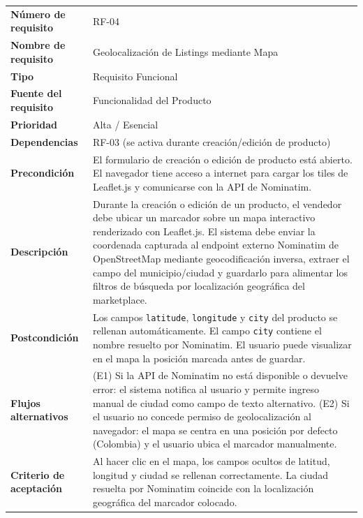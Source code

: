 \documentclass[11pt,a4paper]{report}
\begin{document}
\begin{table}[H]
\centering
\begin{tabularx}{\textwidth}{|l|L|}
\hline
{} \\ \hline
\textbf{Número de requisito} & RF-04 \\ \hline
\textbf{Nombre de requisito} & Geolocalización de Listings mediante Mapa \\ \hline
\textbf{Tipo} & Requisito Funcional \\ \hline
\textbf{Fuente del requisito} & Funcionalidad del Producto \\ \hline
\textbf{Prioridad} & Alta / Esencial \\ \hline
\textbf{Dependencias} & RF-03 (se activa durante creación/edición de producto) \\ \hline
\textbf{Precondición} & El formulario de creación o edición de producto está abierto. El navegador tiene acceso a internet para cargar los tiles de Leaflet.js y comunicarse con la API de Nominatim. \\ \hline
\textbf{Descripción} & Durante la creación o edición de un producto, el vendedor debe ubicar un marcador sobre un mapa interactivo renderizado con Leaflet.js. El sistema debe enviar la coordenada capturada al endpoint externo Nominatim de OpenStreetMap mediante geocodificación inversa, extraer el campo del municipio/ciudad y guardarlo para alimentar los filtros de búsqueda por localización geográfica del marketplace. \\ \hline
\textbf{Postcondición} & Los campos \texttt{latitude}, \texttt{longitude} y \texttt{city} del producto se rellenan automáticamente. El campo \texttt{city} contiene el nombre resuelto por Nominatim. El usuario puede visualizar en el mapa la posición marcada antes de guardar. \\ \hline
\textbf{Flujos alternativos} & (E1) Si la API de Nominatim no está disponible o devuelve error: el sistema notifica al usuario y permite ingreso manual de ciudad como campo de texto alternativo. (E2) Si el usuario no concede permiso de geolocalización al navegador: el mapa se centra en una posición por defecto (Colombia) y el usuario ubica el marcador manualmente. \\ \hline
\textbf{Criterio de aceptación} & Al hacer clic en el mapa, los campos ocultos de latitud, longitud y ciudad se rellenan correctamente. La ciudad resuelta por Nominatim coincide con la localización geográfica del marcador colocado. \\ \hline
\end{tabularx}
\end{table}
\end{document}
